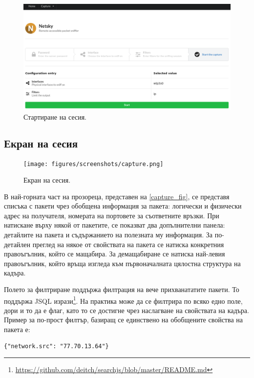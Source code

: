 \documentclass[12pt,a4paper,oneside]{book}
\begin{document}
\begin{figure}[h!]
  \centering
  \includegraphics[width=\textwidth]{figures/screenshots/start.png}
  \caption{Стартиране на сесия.}
  \label{screenshots_start_fig}
\end{figure}

\subsection{Екран на сесия}

\begin{figure}[h!]
  \centering
  \texttt{[image: figures/screenshots/capture.png]}
  \caption{Екран на сесия.}
  \label{capture_fig}
\end{figure}

В най-горната част на прозореца, представен на \autoref{capture_fig}, се представя списъка с пакети чрез обобщена
информация за пакета: логически и физически адрес на получателя, номерата на
портовете за съответните връзки. При натискане върху някой от пакетите, се
показват два допълнителни панела: детайлите на пакета и съдържанието на
полезната му информация.
За по-детайлен преглед на някое от свойствата на пакета се натиска конкретния
правоъгълник, който се мащабира. За демащабиране се натиска най-левия
правоъгълник, който връща изгледа към първоначалната цялостна структура на
кадъра.

Полето за филтриране поддържа филтрация на вече прихванататите пакети. То
поддържа JSQL
изрази\footnote{\url{https://github.com/deitch/searchjs/blob/master/README.md}}.
На практика може да се филтрира по всяко
едно поле, дори и то да е флаг, като то се достигне чрез наслагване на
свойствата на кадъра. Пример за по-прост филтър, базиращ се единствено на
обобщените свойства на пакета е:

\begin{lstlisting}[caption={Филтър, извеждащ само пакети с
  IP адрес на подателя \texttt{77.70.13.64}}]
  {"network.src": "77.70.13.64"}
\end{lstlisting}
\end{document}
